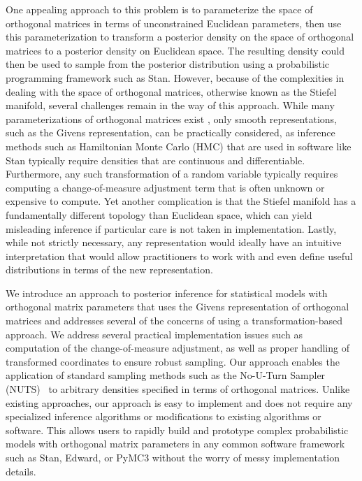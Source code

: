\documentclass[ba]{imsart}
\numberwithin{equation}{section}
\theoremstyle{plain}
\begin{document}
\noindent One appealing approach to this problem is to parameterize the space of orthogonal matrices in terms of unconstrained Euclidean parameters, then use this parameterization to transform a posterior density on the space of orthogonal matrices to a posterior density on Euclidean space. The resulting density could then be used to sample from the posterior distribution using a probabilistic programming framework such as Stan. However, because of the complexities in dealing with the space of orthogonal matrices, otherwise known as the Stiefel manifold, several challenges remain in the way of this approach. While many parameterizations of orthogonal matrices exist \citep{anderson1987generation, shepard2015representation}, only smooth representations, such as the Givens representation, can be practically considered, as inference methods such as Hamiltonian Monte Carlo (HMC) that are used in software like Stan typically require densities that are continuous and differentiable. Furthermore, any such transformation of a random variable typically requires computing a change-of-measure adjustment term that is often unknown or expensive to compute. Yet another complication is that the Stiefel manifold has a fundamentally different topology than Euclidean space, which can yield misleading inference if particular care is not taken in implementation. Lastly, while not strictly necessary, any representation would ideally have an intuitive interpretation that would allow practitioners to work with and even define useful distributions in terms of the new representation.

\noindent We introduce an approach to posterior inference for statistical models with orthogonal matrix parameters that uses the Givens representation of orthogonal matrices and addresses several of the concerns of using a transformation-based approach. We address several practical implementation issues such as computation of the change-of-measure adjustment, as well as proper handling of transformed coordinates to ensure robust sampling. Our approach enables the application of standard sampling methods such as the No-U-Turn Sampler (NUTS)~\citep{hoffman2014no} to arbitrary densities specified in terms of orthogonal matrices. Unlike existing approaches, our approach is easy to implement and does not require any specialized inference algorithms or modifications to existing algorithms or software. This allows users to rapidly build and prototype complex probabilistic models with orthogonal matrix parameters in any common software framework such as Stan, Edward, or PyMC3 without the worry of messy implementation details. 
\end{document}
